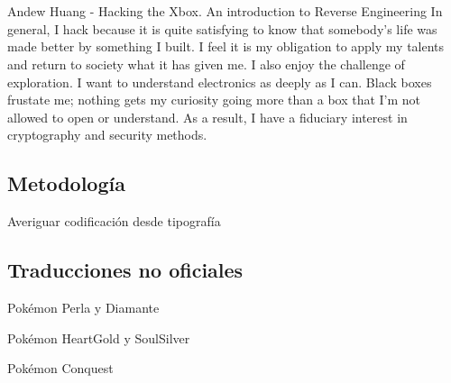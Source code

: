 
\appendix
\backupbegin

\section{\appendixname}

\frame{\tableofcontents}

\begin{frame}
    \begin{alertblock}{Andew Huang - Hacking the Xbox. An introduction to Reverse Engineering}
        In general, I hack because it is quite satisfying to know that somebody's life was made better by something I built. I feel it is my obligation to apply my talents and return to society what it has given me. I also enjoy the challenge of exploration. I want to understand electronics as deeply as I can. Black boxes frustate me; nothing gets my curiosity going more than a box that I'm not allowed to open or understand. As a result, I have a fiduciary interest in cryptography and security methods.
    \end{alertblock}
\end{frame}

\subsection{Metodología}
\begin{frame}{Averiguar codificación desde tipografía}

\end{frame}

\subsection{Traducciones no oficiales}
\begin{frame}{Pokémon Perla y Diamante}
\end{frame}

\begin{frame}{Pokémon HeartGold y SoulSilver}

\end{frame}

\begin{frame}{Pokémon Conquest}

\end{frame}

